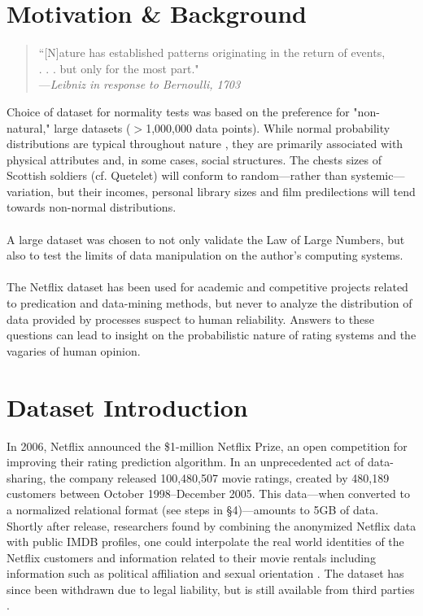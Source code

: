 \documentclass[prodmode,acmtecs]{acmsmall}
\begin{document}
\section{Motivation \& Background}
\medskip
\begin{quote}
``[N]ature has established patterns originating in the return of events,\\
 . . . but only for the most part."\\

\hspace{5em}---\textit{Leibniz in response to Bernoulli, 1703}
\end{quote}
Choice of dataset for normality tests was based on the preference for "non-natural," large datasets ($>$1,000,000 data points). While normal probability distributions are typical throughout nature \cite{bernstein:against}, they are primarily associated with physical attributes and, in some cases, social structures. The chests sizes of Scottish soldiers (cf. Quetelet) will conform to random---rather than systemic---variation, but their incomes, personal library sizes and film predilections will tend towards non-normal distributions.
\\
\\
A large dataset was chosen to not only validate the Law of Large Numbers, but also to test the limits of data manipulation on the author's computing systems.
\\
\\
The Netflix dataset has been used for academic and competitive projects related to predication and data-mining methods, but never to analyze the distribution of data provided by processes suspect to human reliability. Answers to these questions can lead to insight on the probabilistic nature of rating systems and the vagaries of human opinion.

\section{Dataset Introduction}

In 2006, Netflix announced the \$1-million Netflix Prize, an open competition for improving their rating prediction algorithm. In an unprecedented act of data-sharing, the company released 100,480,507 movie ratings, created by 480,189 customers between  October 1998--December 2005. This data---when converted to a normalized relational format (see steps in \S4)---amounts to 5GB of data. Shortly after release, researchers found by combining the anonymized Netflix data with public IMDB profiles, one could interpolate the real world identities of the Netflix customers and information related to their movie rentals \cite{DBLP:journals/corr/abs-cs-0610105} including information such as political affiliation and sexual orientation \cite{Wired-01}. The dataset has since been withdrawn due to legal liability, but is still available from third parties \cite{netflix-01}.
\end{document}
